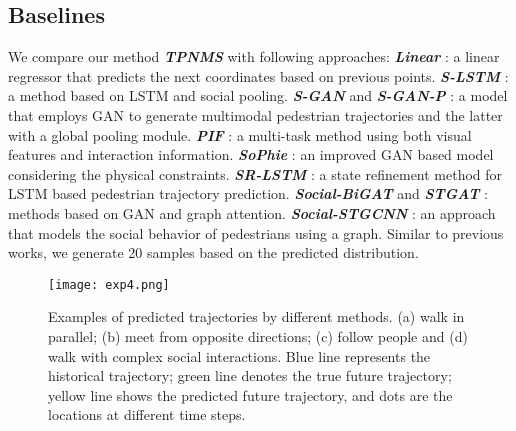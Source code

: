 \documentclass[letterpaper]{article} \usepackage{aaai21}  \usepackage{times}  \usepackage{helvet} \usepackage{courier}  \usepackage[hyphens]{url}  \usepackage{graphicx} \urlstyle{rm} \def\UrlFont{\rm}  \usepackage{natbib}  \usepackage{caption} \frenchspacing  \setlength{\pdfpagewidth}{8.5in}  \setlength{\pdfpageheight}{11in}
\begin{document}
\subsection{Baselines}
We compare our method \textit{\textbf{TPNMS}} with following approaches:
\textit{\textbf{Linear}} \cite{alahi2016social}: a linear regressor that predicts the next coordinates based on previous points.
\textit{\textbf{S-LSTM}} \cite{alahi2016social}: a method based on LSTM and social pooling.
\textit{\textbf{S-GAN}} and \textit{\textbf{S-GAN-P}} \cite{gupta2018social}: a model that employs GAN to generate multimodal pedestrian trajectories and the latter with a global pooling module.
\textit{\textbf{PIF}} \cite{liang2019peeking}: a multi-task method using both visual features and interaction information.
\textit{\textbf{SoPhie}} \cite{sadeghian2019sophie}: an improved GAN based model considering the physical constraints.
\textit{\textbf{SR-LSTM}} \cite{zhang2019sr}: a state refinement method for LSTM based pedestrian trajectory prediction.
\textit{\textbf{Social-BiGAT}} \cite{socialbigat2019} and \textit{\textbf{STGAT}} \cite{huang2019stgat}: methods based on GAN and graph attention.
\textit{\textbf{Social-STGCNN}} \cite{mohamed2020social}: an approach that models the social behavior of pedestrians using a graph. 
Similar to previous works, we generate 20 samples based on the predicted distribution.
\begin{figure*}[!t]
	\centering
	\texttt{[image: exp4.png]}
	\caption{Examples of predicted trajectories by different methods. (a) walk in parallel; (b) meet from opposite directions; (c) follow people and (d) walk with complex social interactions. Blue line represents the historical trajectory; green line denotes the true future trajectory; yellow line shows the predicted future trajectory, and dots are the locations at different time steps. }
	\label{fig:qual_result}
\end{figure*}
\end{document}

